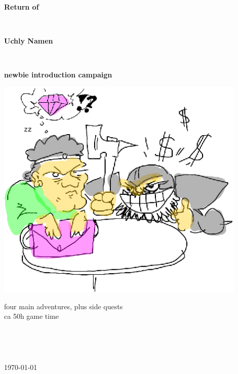 \begin{titlepage}

\begin{center}

   \vspace{4 cm}

   \textbf{\Huge{Return of}}

   \

   \textbf{\Huge{Uchly Namen}}

   \

   \textbf{\Large{newbie introduction campaign}}

   \vspace{2 cm}
   \includegraphics[width=120mm]{./figs/negotiate.eps}

   \vspace{2 cm}

   \normalsize
   four main adventures, plus side quests\\
   ca 50h game time


   \vfill %


   \



   \

   \normalsize{\today}

\end{center}


\end{titlepage}




